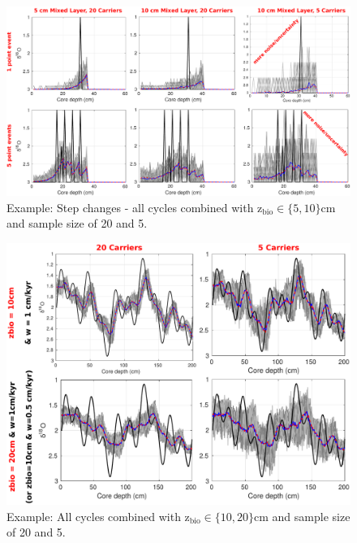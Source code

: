 \documentclass[a4paper,oneside,9pt]{article}
\begin{document}
\begin{figure}[hbp]
\begin{center}
	\includegraphics[width=1.0\textwidth]{../figures/../figures/JustABU_pointevent1+5.pdf}
	\caption{Example: Step changes - all cycles combined with z$_\mathrm{bio} \in \{5,10\}$cm and sample size of 20 and 5. }\label{fig:5pointevent}
\end{center}
\end{figure}



\begin{figure}[hbp]
\begin{center}
	\includegraphics[width=1.0\textwidth]{../figures/../figures/JustABU_3ycles_combined.pdf}
	\caption{Example: All cycles combined with z$_\mathrm{bio} \in \{10,20 \}$cm and sample size of 20 and 5. }\label{fig:5pointevent}
\end{center}
\end{figure}
\end{document}
